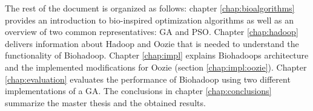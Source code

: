 % 
% 
% 

The rest of the document is organized as follows: chapter \ref{chap:bioalgorithms} provides an introduction to bio-inspired optimization algorithms as well as an overview of two common representatives: GA and PSO. Chapter \ref{chap:hadoop} delivers information about Hadoop and Oozie that is needed to understand the functionality of Biohadoop. Chapter \ref{chap:impl} explains Biohadoops architecture and the implemented modifications for Oozie (section \ref{chap:impl:oozie}). Chapter \ref{chap:evaluation} evaluates the performance of Biohadoop using two different implementations of a GA. The conclusions in chapter \ref{chap:conclusions} summarize the master thesis and the obtained results.



